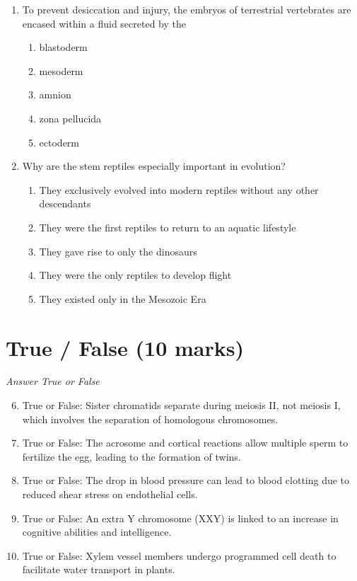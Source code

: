 \documentclass[12pt]{article}
\begin{document}
\begin{enumerate}[label=\arabic*.]
\begin{enumerate}[label=(\alph*)]
    \item The female bacterium becomes a male through the process of osmosis
    \item The female bacterium becomes a male through gene mutation
    \item The female bacterium becomes a male after receiving multiple copies of non-F factor genes
\end{enumerate}
\item To prevent desiccation and injury, the embryos of terrestrial vertebrates are encased
within a fluid secreted by the
\begin{enumerate}[label=(\alph*)]
    \item blastoderm
    \item mesoderm
    \item amnion
    \item zona pellucida
    \item ectoderm
\end{enumerate}
\item Why are the stem reptiles especially important in evolution?
\begin{enumerate}[label=(\alph*)]
    \item They exclusively evolved into modern reptiles without any other descendants
    \item They were the first reptiles to return to an aquatic lifestyle
    \item They gave rise to only the dinosaurs
    \item They were the only reptiles to develop flight
    \item They existed only in the Mesozoic Era
\end{enumerate}
\end{enumerate}

\section*{True / False (10 marks)}
\textit{Answer True or False}
\begin{enumerate}[label=\arabic*.]
\setcounter{enumi}{5}
\item True or False: Sister chromatids separate during meiosis II, not meiosis I, which involves the separation of homologous chromosomes.
\item True or False: The acrosome and cortical reactions allow multiple sperm to fertilize the egg, leading to the formation of twins.
\item True or False: The drop in blood pressure can lead to blood clotting due to reduced shear stress on endothelial cells.
\item True or False: An extra Y chromosome (XXY) is linked to an increase in cognitive abilities and intelligence.
\item True or False: Xylem vessel members undergo programmed cell death to facilitate water transport in plants.
\end{enumerate}
\end{document}
